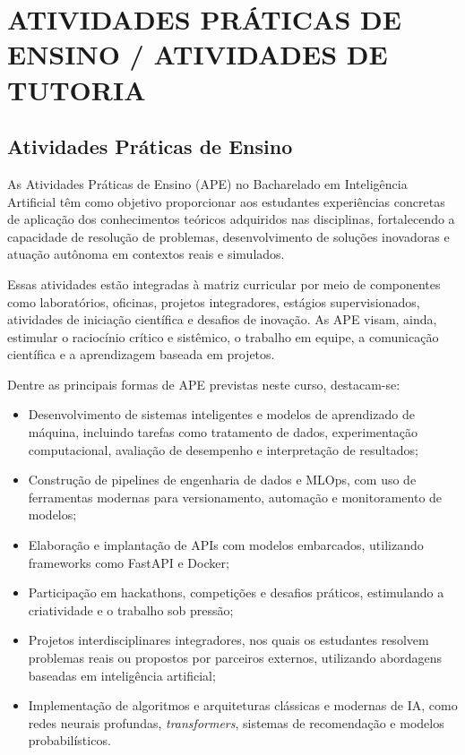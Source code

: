 \chapter{ATIVIDADES PRÁTICAS DE ENSINO / ATIVIDADES DE TUTORIA}
\label{cap:atividades-praticas-de-ensino}

\section{Atividades Práticas de Ensino}

As Atividades Práticas de Ensino (APE) no Bacharelado em Inteligência Artificial têm como objetivo proporcionar aos estudantes experiências concretas de aplicação dos conhecimentos teóricos adquiridos nas disciplinas, fortalecendo a capacidade de resolução de problemas, desenvolvimento de soluções inovadoras e atuação autônoma em contextos reais e simulados.

Essas atividades estão integradas à matriz curricular por meio de componentes como laboratórios, oficinas, projetos integradores, estágios supervisionados, atividades de iniciação científica e desafios de inovação. As APE visam, ainda, estimular o raciocínio crítico e sistêmico, o trabalho em equipe, a comunicação científica e a aprendizagem baseada em projetos.

Dentre as principais formas de APE previstas neste curso, destacam-se:

\begin{itemize}
\item Desenvolvimento de sistemas inteligentes e modelos de aprendizado de máquina, incluindo tarefas como tratamento de dados, experimentação computacional, avaliação de desempenho e interpretação de resultados;
\item Construção de pipelines de engenharia de dados e MLOps, com uso de ferramentas modernas para versionamento, automação e monitoramento de modelos;
\item Elaboração e implantação de APIs com modelos embarcados, utilizando frameworks como FastAPI e Docker;
\item Participação em hackathons, competições e desafios práticos, estimulando a criatividade e o trabalho sob pressão;
\item Projetos interdisciplinares integradores, nos quais os estudantes resolvem problemas reais ou propostos por parceiros externos, utilizando abordagens baseadas em inteligência artificial;
\item Implementação de algoritmos e arquiteturas clássicas e modernas de IA, como redes neurais profundas, \textit{transformers}, sistemas de recomendação e modelos probabilísticos.
\end{itemize}

